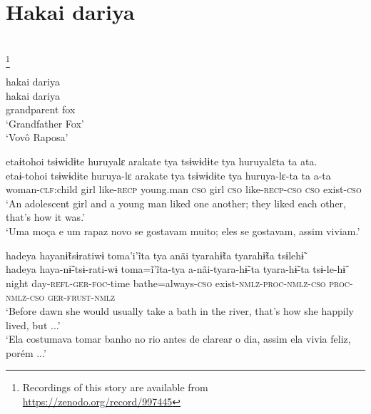 \documentclass[output=paper,
modfonts,nonflat
]{langsci/langscibook}
\begin{document}
\section{Hakai dariya}
\\
\footnote{Recordings of this story are available from \url{https://zenodo.org/record/997445}}


\ea  hakai dariya\\[.3em]
\gll hakai      dariya\\
     grandparent   fox\\
\glt ‘Grandfather Fox’\\
‘Vovô Raposa'
\z 

\ea  etaɨtohoi tsɨwɨdɨte huruyalɛ arakate tya tsɨwɨdɨte tya huruyalɛta ta ata.\\[.3em]
\gll etaɨ-tohoi      tsɨwɨdɨte  huruya-lɛ  arakate    tya    tsɨwɨdɨte  tya    huruya-lɛ-ta    ta    a-ta\\
     woman-\textsc{clf}:child  girl      like-\textsc{recp} young.man  \textsc{cso}  girl      \textsc{cso}  like-\textsc{recp-cso}    \textsc{cso}  exist-\textsc{cso}\\
\glt ‘An adolescent girl and a young man liked one another; they liked each other, that’s how it was.’\\
‘Uma moça e um rapaz novo se gostavam muito; eles se gostavam, assim viviam.'
\z

\ea  hadeya hayanɨ̃tsɨratiwɨ toma'i'ĩta tya anãi tyarahɨ̃ta tyarahɨ̃ta tsɨlehɨ̃\\[.3em]
\gll hadeya  haya-nɨ̃-tsɨ-rati-wɨ    toma=ĩ'ĩta-tya    a-nãi-tyara-hɨ̃-ta{\footnotemark}    tyara-hɨ̃-ta    tsɨ-le-hɨ̃\\
     night  day-\textsc{refl-ger-foc}{}-time  bathe=always-\textsc{cso} exist\textsc{{}-nmlz-proc-nmlz-cso}  \textsc{proc-nmlz-cso}  \textsc{ger-frust-nmlz}\\
\glt ‘Before dawn she would usually take a bath in the river, that’s how she happily lived, but ...’\\
‘Ela costumava tomar banho no rio antes de clarear o dia, assim ela vivia feliz, porém ...'
\z
\end{document}
